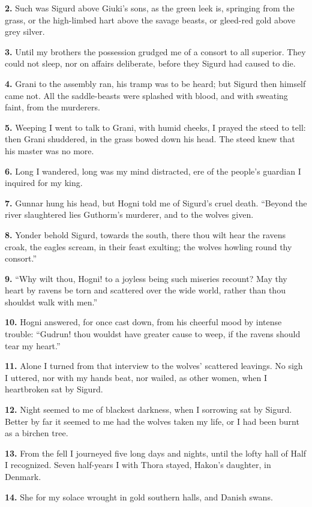 \textbf{2.} Such was Sigurd above Giuki's sons, as the green leek is,
springing from the grass, or the high-limbed hart above the savage
beasts, or gleed-red gold above grey silver.

\textbf{3.} Until my brothers the possession grudged me of a consort to all
superior. They could not sleep, nor on affairs deliberate, before they
Sigurd had caused to die.

\textbf{4.} Grani to the assembly ran, his tramp was to be heard; but Sigurd
then himself came not. All the saddle-beasts were splashed with blood,
and with sweating faint, from the murderers.

\textbf{5.} Weeping I went to talk to Grani, with humid cheeks, I prayed the
steed to tell: then Grani shuddered, in the grass bowed down his
head. The steed knew that his master was no more.

\textbf{6.} Long I wandered, long was my mind distracted, ere of the people's
guardian I inquired for my king.

\textbf{7.} Gunnar hung his head, but Hogni told me of Sigurd's cruel death.
``Beyond the river slaughtered lies Guthorm's murderer, and to the
wolves given.

\textbf{8.} Yonder behold Sigurd, towards the south, there thou wilt hear the
ravens croak, the eagles scream, in their feast exulting; the wolves
howling round thy consort.''

\textbf{9.} ``Why wilt thou, Hogni! to a joyless being such miseries recount?
May thy heart by ravens be torn and scattered over the wide world,
rather than thou shouldst walk with men.''

\textbf{10.} Hogni answered, for once cast down, from his cheerful mood by
intense trouble: ``Gudrun! thou wouldst have greater cause to weep, if
the ravens should tear my heart.''

\textbf{11.} Alone I turned from that interview to the wolves' scattered
leavings. No sigh I uttered, nor with my hands beat, nor wailed, as
other women, when I heartbroken sat by Sigurd.

\textbf{12.} Night seemed to me of blackest darkness, when I sorrowing sat by
Sigurd. Better by far it seemed to me had the wolves taken my life, or
I had been burnt as a birchen tree.

\textbf{13.} From the fell I journeyed five long days and nights, until the
lofty hall of Half I recognized. Seven half-years I with Thora
stayed, Hakon's daughter, in Denmark.

\textbf{14.} She for my solace wrought in gold southern halls, and Danish
swans.

